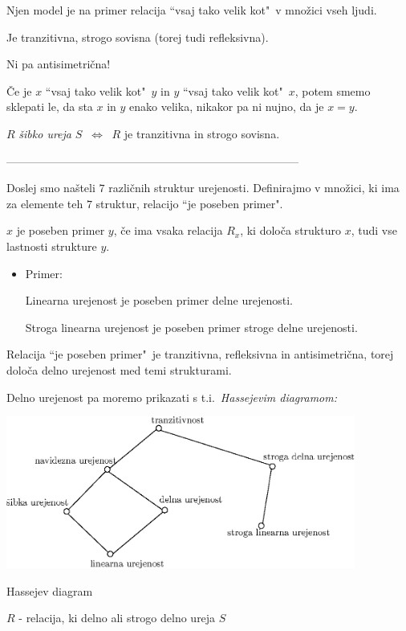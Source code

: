 \documentclass[11pt,paper=b5,footinclude,headinclude]{scrbook} %
\def\cee {{~\Leftrightarrow~}}
\begin{document}
Njen model je na primer relacija ``vsaj tako velik kot"~v množici vseh ljudi.

Je tranzitivna, strogo sovisna (torej tudi refleksivna).

Ni pa antisimetrična!

Če je $x$ ``vsaj tako velik kot"~$y$ in $y$ ``vsaj tako velik kot"~$x$,
potem smemo sklepati le, da sta $x$ in $y$ enako velika, nikakor pa ni nujno, da je $x = y$.

$R$ {\em šibko ureja} $S$ $\cee$ $R$ je tranzitivna in strogo sovisna.

\bigskip

------------------------------------------------------------------------------
\bigskip

Doslej smo našteli $7$ različnih struktur urejenosti.
Definirajmo v množici, ki ima za elemente teh $7$ struktur, relacijo ``je poseben primer".

$x$ je poseben primer $y$, če ima vsaka relacija $R_x$, ki določa strukturo $x$, tudi vse lastnosti strukture $y$.

\begin{itemize}
  \item Primer:

  Linearna urejenost je poseben primer delne urejenosti.

Stroga linearna urejenost je poseben primer stroge delne urejenosti.
\end{itemize}

Relacija ``je poseben primer"~je tranzitivna, refleksivna in antisimetrična, torej določa delno urejenost med temi strukturami.

\newpage
Delno urejenost pa moremo prikazati s t.i.~{\em Hassejevim diagramom:}

\begin{center}
\includegraphics[height=50mm]{strukture.eps}
\end{center}

Hassejev diagram

$R$ - relacija, ki delno ali strogo delno ureja $S$
\end{document}
